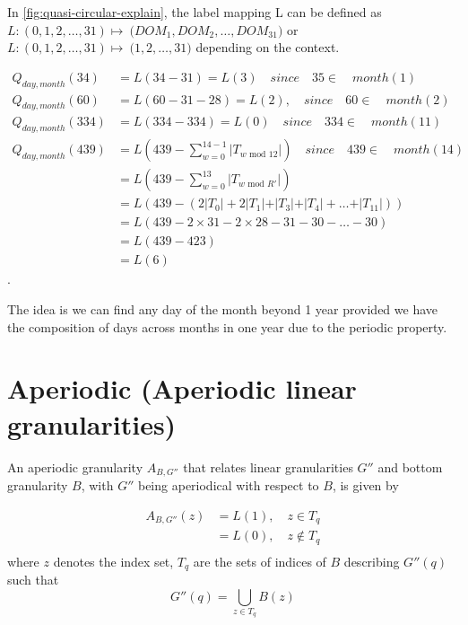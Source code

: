 \documentclass[10pt,a4paper,]{article}
\begin{document}
In \autoref{fig:quasi-circular-explain}, the label mapping L can be defined as \(L: ({0,1,2, \dots, 31}) \longmapsto\ ({DOM_1, DOM_2, \dots, DOM_{31})}\) or \(L: ({0,1,2, \dots, 31}) \longmapsto\ ({1, 2, \dots, 31)}\)
depending on the context.

\begin{equation}
\begin{split}
Q_{day, month}(34) & = L(34 - 31)       = L(3) \quad since \quad 35 \in \quad month(1)\\
Q_{day, month}(60) & = L(60 - 31 - 28)  = L(2) , \quad since\quad 60 \in \quad month(2)\\
Q_{day, month}(334) & = L(334 - 334)    = L(0) \quad since \quad 334 \in \quad month(11)\\
Q_{day, month}(439) & = L(439 - \sum_{w=0}^{14-1}\vert T_{w \text{~mod~}12} \vert)\quad since \quad 439 \in \quad month(14)\\
& = L(439 - \sum_{w=0}^{13}\vert T_{w \text{~mod~}R'} \vert)\\
&  = L(439 - (2\vert T_{0} \vert + 2\vert T_{1}\vert + \vert T_{3}\vert + \vert T_{4}\vert + \dots + \vert T_{11}\vert))\\
&  = L(439 - 2\times 31 - 2\times 28 - 31 - 30 - \dots - 30)\\
&  = L(439 - 423)\\
&  = L(6)
\end{split}
\end{equation}.

The idea is we can find any day of the month beyond 1 year provided we have the composition of days across months in one year due to the periodic property.

\hypertarget{aperiodic-aperiodic-linear-granularities}{%
\section{Aperiodic (Aperiodic linear granularities)}\label{aperiodic-aperiodic-linear-granularities}}

\begin{definition}\label{aperiodic}
An aperiodic granularity $A_{B, G''}$ that relates linear granularities $G''$ and bottom granularity $B$, with $G''$ being aperiodical with respect to $B$, is given by

\begin{equation}\label{eq:eq7}
\begin{split}
A_{B, G''}(z) & = L(1), \quad z \in T_q\\
     & = L(0), \quad z \not\in T_q\\
\end{split}
\end{equation}
where  
$z$ denotes the index set,
$T_q$ are the sets of indices of $B$ describing $G''(q)$ such that $$G''(q) = \bigcup_{z \in T_q}B(z)$$
\end{definition}
\end{document}
